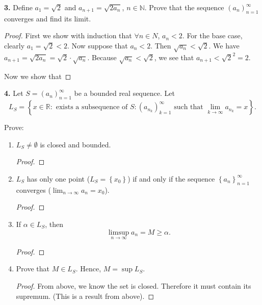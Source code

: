 \documentclass{article}
\newcommand{\R}{\mathbb{R}}
\newcommand{\N}{\mathbb{N}}
\newcommand{\set}[1]{\left\{ #1 \right\}}
\begin{document}
\newpage %

\textbf{3. }
Define $a_1 = \sqrt{2}$ and $a_{n + 1} = \sqrt{2 a_n}$, $n \in \N$. Prove that the sequence $(a_n)_{n = 1}^\infty$ converges and find its limit.

\begin{proof}
    First we show with induction that $\forall n \in N$, $a_n < 2$. For the base case, clearly $a_1 = \sqrt{2} < 2$. Now suppose that $a_n < 2$. Then $\sqrt{a_n} < \sqrt{2}$. We have $a_{n + 1} = \sqrt{2 a_n} = \sqrt{2} \cdot \sqrt{a_n}$. Because $\sqrt{a_n} < \sqrt{2}$, we see that $a_{n + 1} < \sqrt{2}^2 = 2$. 

    Now we show that 
    
\end{proof}


\newpage %


\textbf{4. }
Let $S = (a_n)_{n = 1}^\infty$ be a bounded real sequence. Let
$$L_S = \set{x \in \R : \text{ exists a subsequence of } S : (a_{n_k})_{k = 1}^\infty \text{ such that } \lim_{k \to \infty} a_{n_k} = x}.$$

Prove:
\begin{enumerate}
    \item 
    $L_S \ne \emptyset$ is closed and bounded.
    \begin{proof}
        
    \end{proof}


    \item 
    $L_S$ has only one point ($L_S = \set{x_0}$) if and only if the sequence $\set{a_n}_{n = 1}^\infty$ converges ($\lim_{n \to \infty} a_n = x_0$).
    \begin{proof}



    \end{proof}


    \item 
    If $\alpha \in L_S$, then
    $$\limsup_{n \to \infty} a_n = M \ge \alpha.$$
    \begin{proof}
        
    \end{proof}


    \item 
    Prove that $M \in L_S$. Hence, $M = \sup L_S$.
    \begin{proof}
        From above, we know the set is closed. Therefore it must contain its supremum. (This is a result from above). 
    \end{proof}

\end{enumerate}
\end{document}
